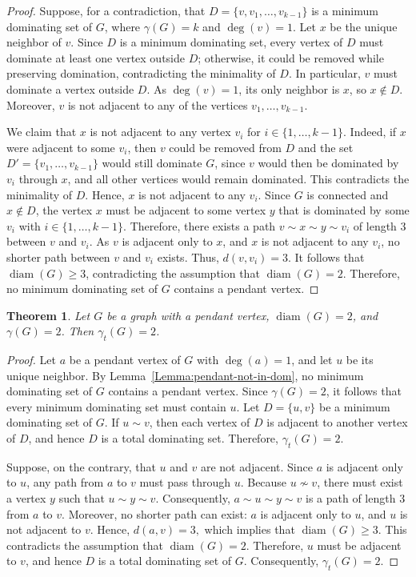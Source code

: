 \documentclass[12pt]{amsart}
\theoremstyle{plain}
\newtheorem{theorem}{Theorem}[section]
\theoremstyle{definition}
\begin{document}
\begin{proof}
Suppose, for a contradiction, that 
$D=\{v,v_1,\dots,v_{k-1}\}$
is a minimum dominating set of $G$, where $\gamma(G)=k$ and $\deg(v)=1$. Let $x$ be the unique neighbor of $v$.
Since $D$ is a minimum dominating set, every vertex of $D$ must dominate at least one vertex outside $D$; otherwise, it could be removed while preserving domination, contradicting the minimality of $D$. In particular, $v$ must dominate a vertex outside $D$. As $\deg(v)=1$, its only neighbor is $x$, so $x \notin D$. Moreover, $v$ is not adjacent to any of the vertices $v_1,\dots,v_{k-1}$.

We claim that $x$ is not adjacent to any vertex $v_i$ for $i\in\{1,\dots,k-1\}$. Indeed, if $x$ were adjacent to some $v_i$, then $v$ could be removed from $D$ and the set
$D'=\{v_1,\dots,v_{k-1}\}$
would still dominate $G$, since $v$ would then be dominated by $v_i$ through $x$, and all other vertices would remain dominated. This contradicts the minimality of $D$. Hence, $x$ is not adjacent to any $v_i$.
Since $G$ is connected and $x \notin D$, the vertex $x$ must be adjacent to some vertex $y$ that is dominated by some $v_i$ with $i\in\{1,\dots,k-1\}$. Therefore, there exists a path
$v \sim x \sim y \sim v_i$
of length $3$ between $v$ and $v_i$. As $v$ is adjacent only to $x$, and $x$ is not adjacent to any $v_i$, no shorter path between $v$ and $v_i$ exists. Thus,
$d(v,v_i)=3.$
It follows that $\operatorname{diam}(G)\ge 3$, contradicting the assumption that $\operatorname{diam}(G)=2$.
Therefore, no minimum dominating set of $G$ contains a pendant vertex.
\end{proof}
  
\begin{theorem}
Let $G$ be a graph with a pendant vertex, $\operatorname{diam}(G)=2$, and $\gamma(G)=2$. Then $\gamma_t(G)=2$.
\end{theorem}

\begin{proof}
Let $a$ be a pendant vertex of $G$ with $\deg(a)=1$, and let $u$ be its unique neighbor. By Lemma~\ref{Lemma:pendant-not-in-dom}, no minimum dominating set of $G$ contains a pendant vertex. Since $\gamma(G)=2$, it follows that every minimum dominating set must contain $u$.
Let $D=\{u,v\}$ be a minimum dominating set of $G$. If $u\sim v$, then each vertex of $D$ is adjacent to another vertex of $D$, and hence $D$ is a total dominating set. Therefore, $\gamma_t(G)=2$.

Suppose, on the contrary, that $u$ and $v$ are not adjacent. Since $a$ is adjacent only to $u$, any path from $a$ to $v$ must pass through $u$. Because $u \nsim v$, there must exist a vertex $y$ such that
$u \sim y \sim v.$
Consequently,
$a \sim u \sim y \sim v$
is a path of length $3$ from $a$ to $v$. 
Moreover, no shorter path can exist: $a$ is adjacent only to $u$, and $u$ is not adjacent to $v$. Hence,
$d(a,v)=3,$
which implies that $\operatorname{diam}(G)\ge 3$. This contradicts the assumption that $\operatorname{diam}(G)=2$.
Therefore, $u$ must be adjacent to $v$, and hence $D$ is a total dominating set of $G$. Consequently, $\gamma_t(G)=2$.
\end{proof}
\end{document}
